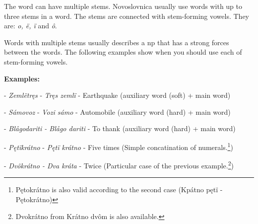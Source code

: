 The word can have multiple stems. Novoslovnica usually use words with up to three stems in a word. The stems are connected with stem-forming vowels. They are: \textit{o, ë, ï} and \textit{ô}.

Words with multiple stems usually describes a \gls{np} that has a strong forces between the words. The following examples show when you should use each of stem-forming vowels.

\textbf{Examples:}

- \textit{Zemlëtręs} - \textit{Tręs zemlï} - Earthquake (auxiliary word (soft) + main word)

- \textit{Sámovoz} - \textit{Vozi sámo} - Automobile (auxiliary word (hard) + main word)

- \textit{Blågodariti - Blågo dariti} - To thank (auxiliary word (hard) + main word)

- \textit{Pętïkrátno} - \textit{Pętï krátno} - Five times (Simple concatination of numerals.\footnote{Pętokrátno is also valid according to the second case (Kpátno pętï - Pętokrátno)})

- \textit{Dvôkrátno - Dva kráta} - Twice (Particular case of the previous example.\footnote{Dvokrátno from Krátno dvôm is also available.})
